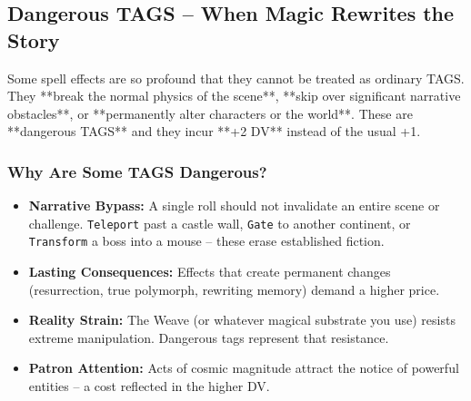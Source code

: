 \begin{tcolorbox}[
  colback=parchment,
  colframe=bronze,
  sharp corners,
  breakable,
  enhanced,
  title=GM Ruling: Healing Magic,
  fonttitle=\bfseries,
  attach boxed title to top left={yshift=-2mm,xshift=4mm},
  boxed title style={colback=bronze, colframe=bronze, sharp corners, rounded corners=north}
]


\subsection*{Dangerous TAGS – When Magic Rewrites the Story}
\label{subsec:dangerous-tags}

Some spell effects are so profound that they cannot be treated as ordinary TAGS. They **break the normal physics of the scene**, **skip over significant narrative obstacles**, or **permanently alter characters or the world**. These are **dangerous TAGS** and they incur **+2 DV** instead of the usual +1.

\subsubsection*{Why Are Some TAGS Dangerous?}
\begin{itemize}
  \item \textbf{Narrative Bypass:} A single roll should not invalidate an entire scene or challenge. \texttt{Teleport} past a castle wall, \texttt{Gate} to another continent, or \texttt{Transform} a boss into a mouse – these erase established fiction.
  \item \textbf{Lasting Consequences:} Effects that create permanent changes (resurrection, true polymorph, rewriting memory) demand a higher price.
  \item \textbf{Reality Strain:} The Weave (or whatever magical substrate you use) resists extreme manipulation. Dangerous tags represent that resistance.
  \item \textbf{Patron Attention:} Acts of cosmic magnitude attract the notice of powerful entities – a cost reflected in the higher DV.
\end{itemize}


\end{tcolorbox}
